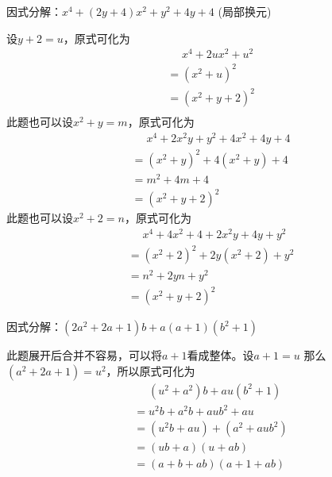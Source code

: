 \documentclass[windows,csize4]{BHCexam}
\begin{document}
\begin{groups}
\begin{questions}[]
        \question[5]因式分解：$x^4+(2y+4)x^2+y^2+4y+4$ (局部换元)
        \begin{solution}{0.5cm}
            \method 设$y+2=u$，原式可化为
            \[
                \begin{aligned}
                     & \phantom{=}x^4+2ux^2+u^2 \\
                     & =(x^2+u)^2               \\
                     & =(x^2+y+2)^2             \\
                \end{aligned}
            \]
            \method 此题也可以设$x^2+y=m$，原式可化为
            \[
                \begin{aligned}
                     & \phantom{=}x^4+2x^2 y+y^2+4x^2+4y+4 \\
                     & =(x^2+y)^2 + 4(x^2+y) +4            \\
                     & =m^2+4m+4                           \\
                     & =(x^2+y+2)^2
                \end{aligned}
            \]
            \method 此题也可以设$x^2+2=n$，原式可化为
            \[
                \begin{aligned}
                     & \phantom{=}x^4+4x^2+4+2x^2 y+4y+y^2 \\
                     & =(x^2+2)^2+2y(x^2+2)+y^2            \\
                     & =n^2+2yn+y^2                        \\
                     & =(x^2+y+2)^2
                \end{aligned}
            \]
        \end{solution}
        \vspace{3.5cm}

        \question[5] 因式分解：$(2a^2+2a+1)b+a(a+1)(b^2+1)$
        \begin{solution}{0.5cm}
            \methodonly 此题展开后合并不容易，可以将$a+1$看成整体。设$a+1=u$
            那么$(a^2+2a+1)=u^2$，所以原式可化为
            \[
                \begin{aligned}
                     & \phantom{=}(u^2+a^2)b+au(b^2+1) \\
                     & =u^2b+a^2b+aub^2+au             \\
                     & =(u^2b+au)+(a^2+aub^2)          \\
                     & =(ub+a)(u+ab)                   \\
                     & =(a+b+ab)(a+1+ab)
                \end{aligned}
            \]
        \end{solution}
        \vspace{3.5cm}


\end{questions}
\end{groups}
\end{document}
